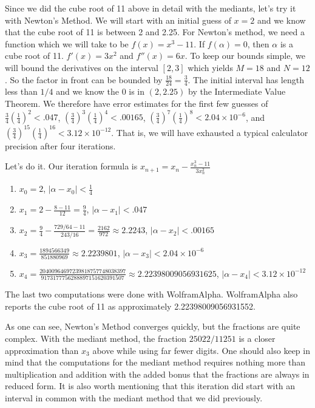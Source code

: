 \documentclass[12pt]{article}
\begin{document}
Since we did the cube root of 11 above in detail with the mediants, let's try it with Newton's Method. We will start with an initial guess of $x=2$ and we know that the cube root of 11 is between 2 and 2.25. For Newton's method, we need a function which we will take to be $f(x) = x^3 - 11$. If $f(\alpha)= 0$, then $\alpha$ is a cube root of 11. $f'(x) = 3x^2$ and $f''(x) = 6x$. To keep our bounds simple, we will bound the derivatives on the interval $[2,3]$ which yields $M = 18$ and $N = 12$. So the factor in front can be bounded by $\frac{18}{24}=\frac{3}{4}$. The initial interval has length less than $1/4$ and we know the $0$ is in $(2, 2.25)$ by the Intermediate Value Theorem. We therefore have error estimates for the first few guesses of $\frac{3}{4}(\frac{1}{4})^2 < .047$, $(\frac{3}{4})^3(\frac{1}{4})^4 < .00165$, $(\frac{3}{4})^7(\frac{1}{4})^8 < 2.04\times 10^{-6}$, and $(\frac{3}{4})^{15}(\frac{1}{4})^{16} < 3.12 \times 10^{-12}$. That is, we will have exhausted a typical calculator precision after four iterations. 

Let's do it. Our iteration formula is $x_{n+1} = x_n - \frac{x_n^3 -11}{3 x_n^2}$ 
\begin{enumerate}
\item $x_0 = 2$, $|\alpha - x_0| < \frac{1}{4}$
\item $x_1 = 2 - \frac{8- 11}{12} = \frac{9}{4}$, $|\alpha - x_1| < .047$
\item $x_2 = \frac{9}{4} - \frac{ 729/64 - 11 }{243/16} = \frac{2162}{972}\approx 2.2243 $, $|\alpha - x_2| < .00165$
\item $x_3 = \frac{1894566349}{851880969} \approx 2.2239801 $, $|\alpha - x_3| < 2.04\times 10^{-6}$
\item $x_4 = \frac{20400964697239818757748038397}{9173177756288897151620391507} \approx 2.22398009056931625 $, $|\alpha - x_4| < 3.12 \times 10^{-12}$
\end{enumerate}


The last two computations were done with WolframAlpha.  WolframAlpha also reports the cube root of 11 as approximately 2.22398009056931552. 

As one can see, Newton's Method converges quickly, but the fractions are quite complex. With the mediant method, the fraction $25022/11251$ is a closer approximation than $x_3$ above while using far fewer digits. One should also keep in mind that the computations for the mediant method requires nothing more than multiplication and addition with the added bonus that the fractions are always in reduced form. It is also worth mentioning that this iteration did start with an interval in common with the mediant method that we did previously. 
\end{document}
